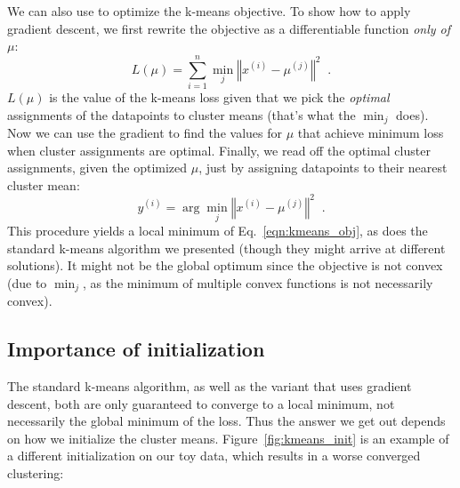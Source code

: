 We can also use   to optimize the k-means objective.  To show how to apply
gradient descent, we first rewrite the objective as a differentiable
function \textit{only of} $\mu$:
\begin{equation}
  L(\mu) = \sum_{i=1}^n \min_j \left\Vert x^{(i)} - \mu^{(j)} \right\Vert^2 \;\;.
\end{equation}
$L(\mu)$ is the value of the k-means loss given that we pick the
\textit{optimal} assignments of the datapoints to cluster means
(that's what the $\min_j$ does). Now we can use the
gradient to find
the values for $\mu$ that achieve minimum loss when cluster
assignments are optimal.  Finally, we read off the optimal cluster
assignments, given the optimized $\mu$, just by assigning datapoints
to their nearest cluster mean:
\begin{equation}
  y^{(i)} = \arg\min_j \left\Vert x^{(i)} - \mu^{(j)} \right\Vert^2 \;\;.
\end{equation}
This procedure yields a local minimum of Eq.~\ref{eqn:kmeans_obj}, as
does the standard k-means algorithm we presented (though they might
arrive at different solutions). It might not be the global optimum
since the objective is not convex (due to $\min_j$, as the minimum of
multiple convex functions is not necessarily convex).



\subsection{Importance of initialization}
The standard k-means algorithm, as well as the variant that uses
gradient descent, both are only guaranteed to converge to a local
minimum, not necessarily the global minimum of the loss. Thus the
answer we get out depends on how we initialize the cluster
means. Figure~\ref{fig:kmeans_init} is an example of a different
initialization on our toy data, which results in a worse converged
clustering:

